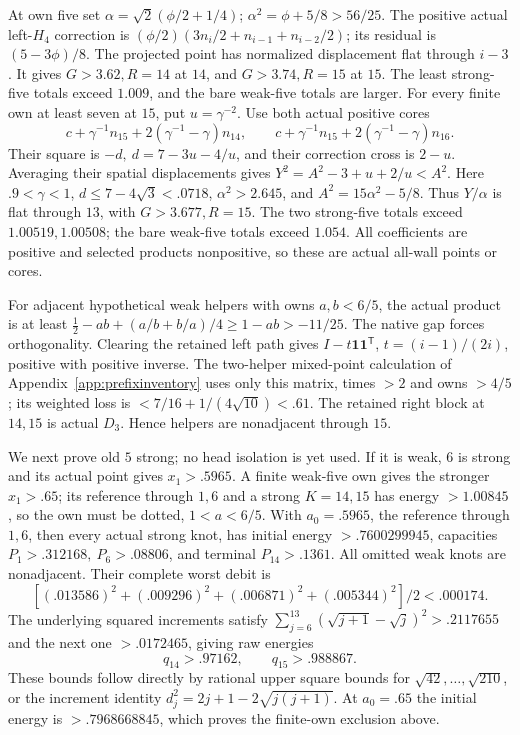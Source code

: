 At own five set \(\alpha=\sqrt2(\phi/2+1/4)\);
\(\alpha^2=\phi+5/8>56/25\).
The positive actual left-\(H_4\) correction is
\((\phi/2)(3n_i/2+n_{i-1}+n_{i-2}/2)\);
its residual is \((5-3\phi)/8\).
The projected point has normalized displacement flat through \(i-3\).
It gives \(G>3.62,R=14\) at \(14\), and \(G>3.74,R=15\)
at \(15\). The least strong-five totals exceed \(1.009\),
and the bare weak-five totals are larger.
For every finite own at least seven at \(15\), put \(u=\gamma^{-2}\).
Use both actual positive cores
\[
 c+\gamma^{-1}n_{15}+2(\gamma^{-1}-\gamma)n_{14},
 \qquad
 c+\gamma^{-1}n_{15}+2(\gamma^{-1}-\gamma)n_{16}.
\]
Their square is \(-d,\ d=7-3u-4/u\), and their correction
cross is \(2-u\).
Averaging their spatial displacements gives
\(Y^2=A^2-3+u+2/u<A^2\).
Here \(.9<\gamma<1\), \(d\leq7-4\sqrt3<.0718\),
\(\alpha^2>2.645\), and
\(A^2=15\alpha^2-5/8\).
Thus \(Y/\alpha\) is flat through \(13\), with
\(G>3.677,R=15\).
The two strong-five totals exceed \(1.00519,1.00508\);
the bare weak-five totals exceed \(1.054\).
All coefficients are positive and selected products nonpositive,
so these are actual all-wall points or cores.

For adjacent hypothetical weak helpers with owns \(a,b<6/5\),
the actual product is at least
\(\tfrac12-ab+(a/b+b/a)/4\geq1-ab>-11/25\).
The native gap forces orthogonality.
Clearing the retained left path gives
\(I-t\mathbf1\mathbf1^{\mathsf T}\), \(t=(i-1)/(2i)\),
positive with positive inverse.
The two-helper mixed-point calculation of
Appendix~\ref{app:prefixinventory} uses only this matrix, times \(>2\)
and owns \(>4/5\); its weighted loss is
\(<7/16+1/(4\sqrt{10})<.61\).
The retained right block at \(14,15\) is actual \(D_3\).
Hence helpers are nonadjacent through \(15\).

We next prove old \(5\) strong; no head isolation is yet used.
If it is weak, \(6\) is strong and its actual point gives
\(x_1>.5965\). A finite weak-five own gives the stronger \(x_1>.65\);
its reference through \(1,6\) and a strong \(K=14,15\) has energy
\(>1.00845\), so the own must be dotted, \(1<a<6/5\).
With \(a_0=.5965\), the reference through \(1,6\), then every actual
strong knot, has initial energy \(>.7600299945\),
capacities \(P_1>.312168,\ P_6>.08806\), and terminal
\(P_{14}>.1361\).
All omitted weak knots are nonadjacent. Their complete worst debit is
\[
 [(.013586)^2+(.009296)^2+(.006871)^2+(.005344)^2]/2
 <.000174 .
\]
The underlying squared increments satisfy
\(\sum_{j=6}^{13}(\sqrt{j+1}-\sqrt j)^2>.2117655\)
and the next one \(>.0172465\), giving raw energies
\[
 q_{14}>.97162,\qquad q_{15}>.988867.
\]
These bounds follow directly by rational upper square bounds for
\(\sqrt{42},\ldots,\sqrt{210}\), or the increment identity
\(d_j^2=2j+1-2\sqrt{j(j+1)}\).
At \(a_0=.65\) the initial energy is \(>.7968668845\),
which proves the finite-own exclusion above.

